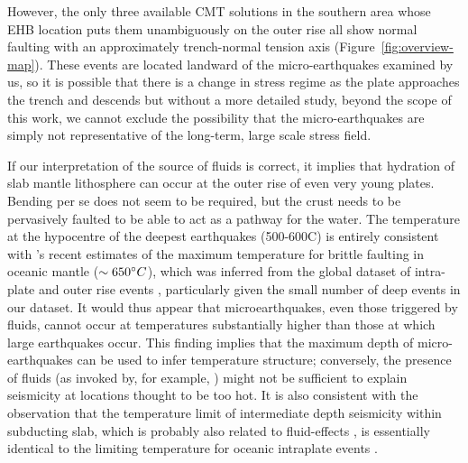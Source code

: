 \documentclass[reviewcopy]{elsart}
\begin{document}
However, the only three available CMT solutions in the southern area whose
EHB location puts them unambiguously on the outer rise
 all show normal faulting with an
approximately trench-normal tension axis
(Figure~\ref{fig:overview-map}). These events are located landward
of the micro-earthquakes examined by us, so it is possible that there
is a change in stress regime as the plate approaches the trench and
descends but without a more detailed study, beyond the scope of
this work, we cannot exclude the possibility that the
micro-earthquakes are simply not representative of the long-term, large
scale stress field. 

If our interpretation of the source of fluids is correct, it implies that hydration of slab
mantle lithosphere can occur at the outer rise of even very young
plates. Bending per se does not seem to be required, but the crust
needs to be pervasively faulted to be able to act as a pathway for the
water.     The temperature at the hypocentre of the deepest earthquakes
 (500-600\dg C) is entirely consistent with \citeauthor{mckenzie05}'s
 \citeyearpar{mckenzie05} recent estimates of the maximum temperature
 for brittle faulting in oceanic mantle ($\sim 650\mbox{$^{\circ}$} C$), which was  inferred from the global
 dataset of intra-plate and outer rise events \citep{wiens83},
 particularly given the small number of deep events in our dataset.
 It would thus appear that microearthquakes, even those triggered by
 fluids, cannot occur at temperatures substantially higher than those
 at which large earthquakes occur.  This finding implies that the
 maximum depth of micro-earthquakes can be used to infer temperature
 structure; conversely, the presence of fluids (as invoked by, for example,
 \citealp{reyners07}) might not be 
 sufficient to explain seismicity at locations thought to
 be too hot.
 It is also consistent with the observation that the
 temperature limit of intermediate depth seismicity within subducting slab, which is probably
 also related to fluid-effects \citep[e.g.]{peacock01}, is essentially
 identical to the limiting temperature for oceanic intraplate events \citep{emmerson07}.
\end{document}
